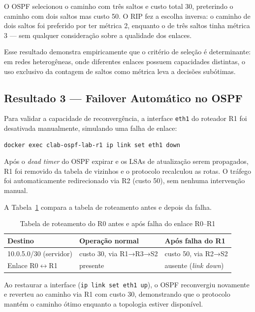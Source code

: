 \documentclass[12pt]{article}
\begin{document}
O OSPF selecionou o caminho com três saltos e custo total 30, preterindo o caminho
com dois saltos mas custo 50. O RIP fez a escolha inversa: o caminho de dois saltos
foi preferido por ter métrica 2, enquanto o de três saltos tinha métrica 3 — sem
qualquer consideração sobre a qualidade dos enlaces.

Esse resultado demonstra empiricamente que o critério de seleção é determinante: em
redes heterogêneas, onde diferentes enlaces possuem capacidades distintas, o uso
exclusivo da contagem de saltos como métrica leva a decisões subótimas.

\subsection{Resultado 3 — Failover Automático no OSPF}

Para validar a capacidade de reconvergência, a interface \texttt{eth1} do roteador
R1 foi desativada manualmente, simulando uma falha de enlace:

\begin{verbatim}
docker exec clab-ospf-lab-r1 ip link set eth1 down
\end{verbatim}

Após o \textit{dead timer} do OSPF expirar e os LSAs de atualização serem
propagados, R1 foi removido da tabela de vizinhos e o protocolo recalculou as rotas.
O tráfego foi automaticamente redirecionado via R2 (custo 50), sem nenhuma
intervenção manual.

A Tabela~\ref{tab:failover} compara a tabela de roteamento antes e depois da falha.

\begin{table}[h]
\centering
\caption{Tabela de roteamento do R0 antes e após falha do enlace R0–R1}
\label{tab:failover}
\begin{tabular}{@{}lll@{}}
\toprule
\textbf{Destino} & \textbf{Operação normal} & \textbf{Após falha do R1} \\
\midrule
10.0.5.0/30 (servidor) & custo 30, via R1→R3→S2 & custo 50, via R2→S2 \\
Enlace R0\(\longleftrightarrow \)R1           & presente               & ausente (\textit{link down}) \\
\bottomrule
\end{tabular}
\end{table}

Ao restaurar a interface (\texttt{ip link set eth1 up}), o OSPF reconvergiu
novamente e reverteu ao caminho via R1 com custo 30, demonstrando que o protocolo
mantém o caminho ótimo enquanto a topologia estiver disponível.
\end{document}
